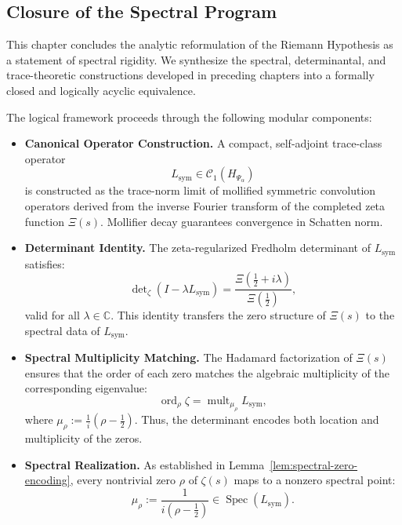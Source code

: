 \subsection*{Closure of the Spectral Program}

This chapter concludes the analytic reformulation of the Riemann Hypothesis as a statement of spectral rigidity. We synthesize the spectral, determinantal, and trace-theoretic constructions developed in preceding chapters into a formally closed and logically acyclic equivalence.

\medskip
\noindent
The logical framework proceeds through the following modular components:

\begin{itemize}
  \item \textbf{Canonical Operator Construction.}  
  A compact, self-adjoint trace-class operator
  \[
  L_{\mathrm{sym}} \in \mathcal{C}_1(H_{\Psi_\alpha})
  \]
  is constructed as the trace-norm limit of mollified symmetric convolution operators derived from the inverse Fourier transform of the completed zeta function \( \Xi(s) \). Mollifier decay guarantees convergence in Schatten norm.

  \item \textbf{Determinant Identity.}  
  The zeta-regularized Fredholm determinant of \( L_{\mathrm{sym}} \) satisfies:
  \[
  \det\nolimits_\zeta(I - \lambda L_{\mathrm{sym}}) = \frac{\Xi\left(\tfrac{1}{2} + i\lambda\right)}{\Xi\left(\tfrac{1}{2}\right)},
  \]
  valid for all \( \lambda \in \mathbb{C} \). This identity transfers the zero structure of \( \Xi(s) \) to the spectral data of \( L_{\mathrm{sym}} \).

  \item \textbf{Spectral Multiplicity Matching.}  
  The Hadamard factorization of \( \Xi(s) \) ensures that the order of each zero matches the algebraic multiplicity of the corresponding eigenvalue:
  \[
  \operatorname{ord}_{\rho} \zeta = \operatorname{mult}_{\mu_\rho} L_{\mathrm{sym}},
  \]
  where \( \mu_\rho := \frac{1}{i}(\rho - \tfrac{1}{2}) \). Thus, the determinant encodes both location and multiplicity of the zeros.

  \item \textbf{Spectral Realization.}  
  As established in Lemma~\ref{lem:spectral-zero-encoding}, every nontrivial zero \( \rho \) of \( \zeta(s) \) maps to a nonzero spectral point:
  \[
  \mu_\rho := \frac{1}{i(\rho - \tfrac{1}{2})} \in \operatorname{Spec}(L_{\mathrm{sym}}).
  \]


\end{itemize}
